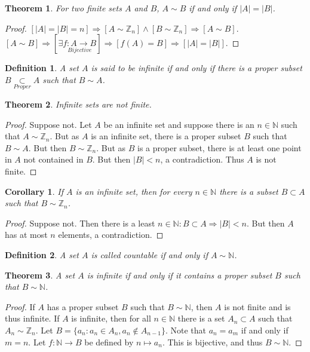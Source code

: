 \documentclass[12pt,oneside]{book}
\theoremstyle{mystyle}
\newtheorem{theorem}{Theorem}[section]
\newtheorem{definition}{Definition}[section]
\newtheorem{corollary}{Corollary}[section]
\begin{document}
\begin{theorem}
For two finite sets $A$ and $B$, $A\sim B$ if and only if $|A|=|B|$.
\end{theorem}
\begin{proof}
$[|A|=|B|=n]\Rightarrow[A\sim \mathbb{Z}_n]\land[B\sim \mathbb{Z}_n]\Rightarrow [A\sim B]$. $[A\sim B]\Rightarrow [\exists \underset{Bijective}{f:A\rightarrow B}]\Rightarrow [f(A) = B]\Rightarrow [|A|=|B|]$.
\end{proof}

\begin{definition}
A set $A$ is said to be infinite if and only if there is a proper subset $B\underset{Proper}\subset A$ such that $B\sim A$.
\end{definition}

\begin{theorem}
Infinite sets are not finite.
\end{theorem}
\begin{proof}
Suppose not. Let $A$ be an infinite set and suppose there is an $n\in \mathbb{N}$ such that $A\sim \mathbb{Z}_n$. But as $A$ is an infinite set, there is a proper subset $B$ such that $B\sim A$. But then $B\sim \mathbb{Z}_n$. But as $B$ is a proper subset, there is at least one point in $A$ not contained in $B$. But then $|B|<n$, a contradiction. Thus $A$ is not finite.
\end{proof}

\begin{corollary}
If $A$ is an infinite set, then for every $n\in \mathbb{N}$ there is a subset $B\subset A$ such that $B\sim \mathbb{Z}_n$.
\end{corollary}
\begin{proof}
Suppose not. Then there is a least $n\in \mathbb{N}:B\subset A\Rightarrow |B|<n$. But then $A$ has at most $n$ elements, a contradiction.
\end{proof}

\begin{definition}
A set $A$ is called countable if and only if $A\sim \mathbb{N}$.
\end{definition}

\begin{theorem}
A set $A$ is infinite if and only if it contains a proper subset $B$ such that $B\sim \mathbb{N}$.
\end{theorem}
\begin{proof}
If $A$ has a proper subset $B$ such that $B\sim \mathbb{N}$, then $A$ is not finite and is thus infinite. If $A$ is infinite, then for all $n\in \mathbb{N}$ there is a set $A_n\subset A$ such that $A_n \sim \mathbb{Z}_n$. Let $B = \{a_n: a_n \in A_n, a_n \notin A_{n-1}\}$. Note that $a_{n} = a_{m}$ if and only if $m= n$. Let $f:\mathbb{N} \rightarrow B$ be defined by $n\mapsto a_n$. This is bijective, and thus $B\sim \mathbb{N}$.
\end{proof}
\end{document}
